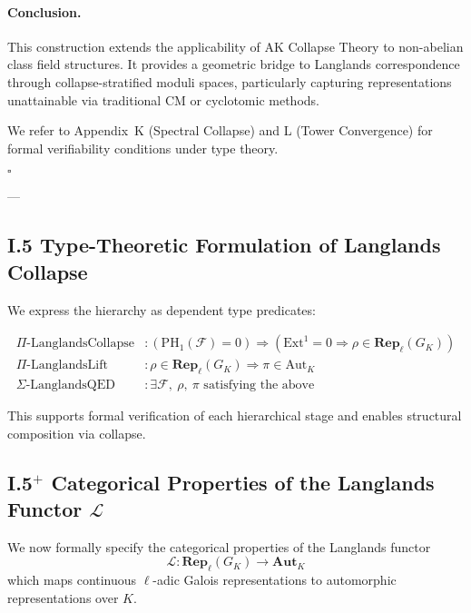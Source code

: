 \documentclass[11pt]{article}
\begin{document}
\paragraph{Conclusion.}

This construction extends the applicability of AK Collapse Theory to non-abelian class field structures.  
It provides a geometric bridge to Langlands correspondence through collapse-stratified moduli spaces, particularly capturing representations unattainable via traditional CM or cyclotomic methods.

We refer to Appendix~K (Spectral Collapse) and L (Tower Convergence) for formal verifiability conditions under type theory.

\hfill $\square$


---

\subsection*{I.5 Type-Theoretic Formulation of Langlands Collapse}

We express the hierarchy as dependent type predicates:

\begin{align*}
\Pi\text{-LanglandsCollapse} &: \left( \mathrm{PH}_1(\mathcal{F}) = 0 \right) \Rightarrow \left( \mathrm{Ext}^1 = 0 \Rightarrow \rho \in \mathbf{Rep}_{\ell}(G_K) \right) \\
\Pi\text{-LanglandsLift} &: \rho \in \mathbf{Rep}_{\ell}(G_K) \Rightarrow \pi \in \text{Aut}_K \\
\Sigma\text{-LanglandsQED} &: \exists \mathcal{F},\ \rho,\ \pi \text{ satisfying the above}
\end{align*}

This supports formal verification of each hierarchical stage and enables structural composition via collapse.

\subsection*{I.5$^+$ Categorical Properties of the Langlands Functor $\mathcal{L}$}
\label{sec:langlands-functor-structure}

We now formally specify the categorical properties of the Langlands functor
\[
\mathcal{L} : \mathbf{Rep}_\ell(G_K) \to \mathbf{Aut}_K
\]
which maps continuous \( \ell \)-adic Galois representations to automorphic representations over \( K \).
\end{document}
